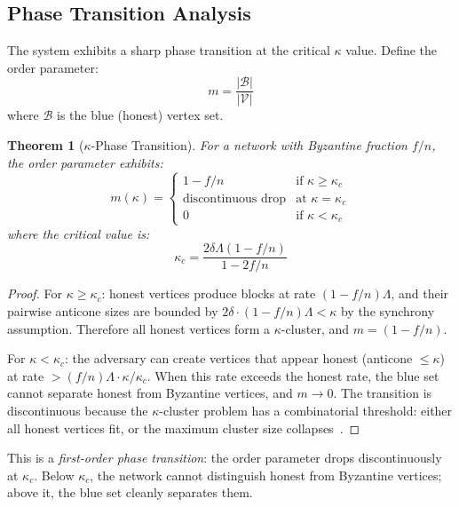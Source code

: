 \documentclass[12pt,a4paper,twocolumn]{article}
\newtheorem{theorem}{Theorem}
\newcommand{\kparam}{\kappa}
\newcommand{\vertexset}{\mathcal{V}}
\begin{document}
\subsection{Phase Transition Analysis}

The system exhibits a sharp phase transition at the critical $\kparam$ value. Define the order parameter:
\begin{equation}
m = \frac{|\mathcal{B}|}{|\vertexset|}
\end{equation}
where $\mathcal{B}$ is the blue (honest) vertex set.

\begin{theorem}[$\kparam$-Phase Transition]
\label{thm:phase_transition}
For a network with Byzantine fraction $f/n$, the order parameter exhibits:
\begin{equation}
m(\kparam) = \begin{cases}
1 - f/n & \text{if } \kparam \geq \kparam_c \\
\text{discontinuous drop} & \text{at } \kparam = \kparam_c \\
0 & \text{if } \kparam < \kparam_c
\end{cases}
\end{equation}
where the critical value is:
\begin{equation}
\kparam_c = \frac{2\delta\Lambda(1 - f/n)}{1 - 2f/n}
\end{equation}
\end{theorem}

\begin{proof}
For $\kparam \geq \kparam_c$: honest vertices produce blocks at rate $(1-f/n)\Lambda$, and their pairwise anticone sizes are bounded by $2\delta \cdot (1-f/n)\Lambda < \kparam$ by the synchrony assumption. Therefore all honest vertices form a $\kparam$-cluster, and $m = (1-f/n)$.

For $\kparam < \kparam_c$: the adversary can create vertices that appear honest (anticone $\leq \kparam$) at rate $> (f/n)\Lambda \cdot \kparam/\kparam_c$. When this rate exceeds the honest rate, the blue set cannot separate honest from Byzantine vertices, and $m \to 0$. The transition is discontinuous because the $\kparam$-cluster problem has a combinatorial threshold: either all honest vertices fit, or the maximum cluster size collapses~\cite{dagknight}.
\end{proof}

This is a \emph{first-order phase transition}: the order parameter drops discontinuously at $\kparam_c$. Below $\kparam_c$, the network cannot distinguish honest from Byzantine vertices; above it, the blue set cleanly separates them.
\end{document}
